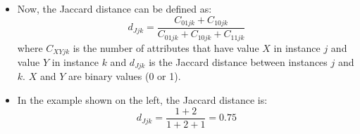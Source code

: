 \xngetheight{\resizebox{\picwidth}{!}{\gendatatab}}{\dummy}
\parbox[b][\gdtheight - 1ex][t]{\textwidth - \picwidth}{
\begin{itemize}
\item Now, the Jaccard distance can be defined as:
  {\scriptsize 
    $$ d_{Jjk} = \dfrac{C_{01jk}+C_{10jk}}{C_{01jk}+C_{10jk}+C_{11jk}} $$
  }
where $C_{XYjk}$ is the number of attributes that have value $X$ in instance $j$ and value $Y$ in instance $k$ and $d_{Jjk}$ is the Jaccard distance between instances $j$ and $k$. $X$ and $Y$ are binary values (0 or 1).  
\end{itemize}}

\parbox[b][\extabheight - 1ex][t]{\textwidth - \picwidth}{
  \begin{itemize}
  \item In the example shown on the left, the Jaccard distance is:
    {\scriptsize 
      $$d_{Jjk} = \dfrac{1+2}{1+2+1}= 0.75 $$
    }
  \end{itemize}
}
\newpage


